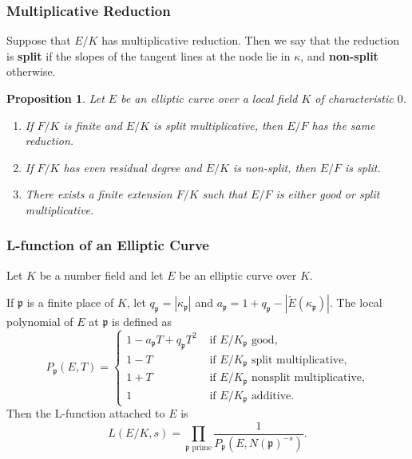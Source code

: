\documentclass{beamer}
\newcommand{\pp}{\mathfrak{p}}
\theoremstyle{plain}
\newtheorem{proposition}[thm]{Proposition}
\begin{document}
\begin{frame}
    \frametitle{Multiplicative Reduction}
    \begin{definition}
        Suppose that $E/K$ has multiplicative reduction. Then we say that the reduction is \textbf{split} if the slopes of the tangent lines at the node lie in $\kappa$, and \textbf{non-split} otherwise.
    \end{definition}
    \begin{proposition}
        Let $E$ be an elliptic curve over a local field $K$ of characteristic $0$. 
        \begin{enumerate}
            \item If $F/K$ is finite and $E/K$ is split multiplicative, then $E/F$ has the same reduction.
            \item If $F/K$ has even residual degree and $E/K$ is non-split, then $E/F$ is split.
            \item There exists a finite extension $F/K$ such that $E/F$ is either good or split multiplicative.
        \end{enumerate}
    \end{proposition}   
\end{frame}
\fi



\begin{frame}
    \frametitle{L-function of an Elliptic Curve}
    Let $K$ be a number field and let $E$ be an elliptic curve over $K$. \pause
    \begin{definition}
        If $\pp$ is a finite place of $K$, let $q_\pp=|\kappa_\pp|$ and $a_\pp=1+q_\pp-|\tilde{E}(\kappa_\pp)|$. \pause The local polynomial of $E$ at $\pp$ is defined as
        \[
            P_\pp(E,T)=
            \begin{cases}
                1-a_\pp T+q_\pp T^2 &\text{ if $E/K_\pp$ good,}\\ 
                1-T &\text{ if $E/K_\pp$ split multiplicative,}\\ 
                1+T &\text{ if $E/K_\pp$ nonsplit multiplicative,}\\    
                1 &\text{ if $E/K_\pp$ additive.}
            \end{cases}
        \]\pause
    Then the L-function attached to $E$ is 
    $$L(E/K,s)=\prod_{\pp\text{ prime}}\frac{1}{P_\pp(E,N(\pp)^{-s})}.$$
    \end{definition}
\end{frame}
\end{document}
